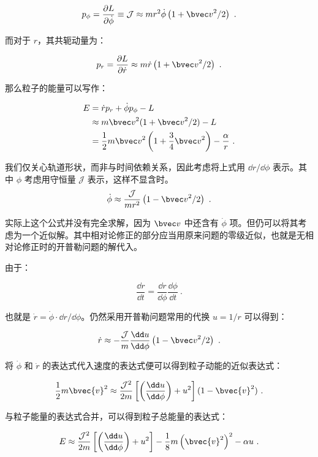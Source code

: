 $$p_\phi = \frac{\partial L}{\partial {\dot \phi}} \equiv \mathcal J \approx mr^2 \dot \phi \left( 1+ {\bvec v}^2/2 \right)~.$$

而对于 $r$，其共轭动量为：

$$p_r = \frac{\partial L}{\partial {\dot r}} \approx m \dot r \left( 1 + {\bvec v}^2/2 \right)~.$$

那么粒子的能量可以写作：

\begin{equation}
\begin{aligned}
E &= \dot r p_r + \dot \phi p_\phi - L \\
&\approx m {\bvec v}^2(1+{\bvec v}^2/2)-L \\
&= \frac{1}{2} m {\bvec v}^2 \left( 1 + \frac{3}{4} {\bvec v}^2 \right) - \frac{\alpha}{r} ~.
\end{aligned}
\end{equation}

我们仅关心轨道形状，而非与时间依赖关系，因此考虑将上式用 $\dd{r}/\dd{\phi}$ 表示。其中 $\phi$ 考虑用守恒量 $\mathcal J$ 表示，这样不显含时。
$$\dot \phi \approx \frac{\mathcal J}{mr^2} \left( 1-{\bvec v}^2/2 \right) ~.$$

实际上这个公式并没有完全求解，因为 $\bvec v$ 中还含有 $\dot \phi$ 项。但仍可以将其考虑为一个近似解。其中相对论修正的部分应当用原来问题的零级近似，也就是无相对论修正时的开普勒问题的解代入。

由于：

$$\frac{\dd r}{\dd t} = \frac{\dd r}{\dd \phi} \frac{\dd \phi} {\dd t}~.$$

也就是 $\dot r = \dot \phi \cdot \dd{r}/\dd{\phi}$。仍然采用开普勒问题常用的代换 $u = 1/r$ 可以得到：

\begin{equation}
\dot r \approx - \frac{\mathcal J}{m} \frac{\dd u}{\dd \phi} \left(1-{\bvec v}^2/2\right)
~.\end{equation}


将 $\dot \phi$ 和 $\dot r$ 的表达式代入速度的表达式便可以得到粒子动能的近似表达式：

\begin{equation}
\frac{1}{2} m \bvec{v}^2 \approx \frac{\mathcal J^2}{2m} \left[\left(\frac{\dd u}{\dd \phi}\right) + u^2\right] (1-\bvec{v}^2)~.
\end{equation}

与粒子能量的表达式合并，可以得到粒子总能量的表达式：

\begin{equation}
E \approx \frac{\mathcal J^2}{2 m} \left[ \left(\frac{\dd u}{\dd \phi}\right) + u^2 \right] - \frac{1}{8} m \left(\bvec{v}^2\right)^2 -\alpha u ~.
\end{equation}


